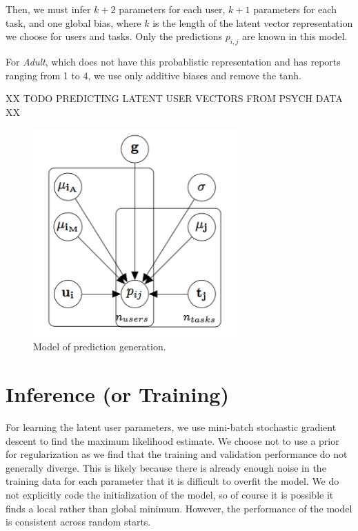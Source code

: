 \documentclass{article}
\begin{document}
  Then, we must infer $k+2$ parameters for each user, $k+1$ parameters for each task, and one global bias, where $k$ is the length of the latent vector representation we choose for users and tasks. Only the predictions $p_{i,j}$ are known in this model.
  
      For \emph{Adult}, which does not have this probablistic representation and has reports ranging from 1 to 4, we use only additive biases and remove the tanh.
      
  XX TODO PREDICTING LATENT USER VECTORS FROM PSYCH DATA XX

\begin{figure}
  \centering
  \includegraphics[height=8cm]{dgmaccurate.png}
  \caption{\label{fig:diagram} Model of prediction generation.}
\end{figure}


\section{Inference (or Training)}

%
%

For learning the latent user parameters, we use mini-batch stochastic gradient descent to find the maximum likelihood estimate. We choose not to use a prior for regularization as we find that the training and validation performance do not generally diverge. This is likely because there is already enough noise in the training data for each parameter that it is difficult to overfit the model. We do not explicitly code the initialization of the model, so of course it is possible it finds a local rather than global minimum. However, the performance of the model is consistent across random starts.
\end{document}
